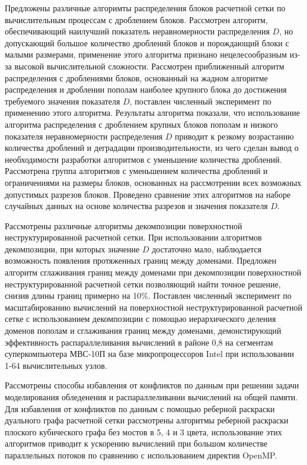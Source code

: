 Предложены различные алгоримты распределения блоков расчетной сетки по вычислительным процессам с дроблением блоков.
Рассмотрен алгоритм, обеспечивающий наилучший показатель неравномерности распределения $D$, но допускающий большое количество дроблений блоков и порождающий блоки с малыми размерами, применение этого алгоритма признано нецелесообразным из-за высокой вычислительной сложности.
Рассмотрен приближенный алгоритм распределения с дроблениями блоков, основанный на жадном алгоритме распределения и дроблении пополам наиболее крупного блока до достижения требуемого значения показателя $D$, поставлен численный эксперимент по применению этого алгоритма.
Результаты алгоритма показали, что использование алгоритма распределения с дроблением крупных блоков пополам и низкого показателя неравномерности распределения $D$ приводит к резкому возрастанию количества дроблений и деградации производительности, из чего сделан вывод о необходимости разработки алгоритмов с уменьшение количества дроблений.
Рассмотрена группа алгоритмов с уменьшением количества дроблений и ограничениями на размеры блоков, основанных на рассмотрении всех возможных допустимых разрезов блоков.
Проведено сравнение этих алгоритмов на наборе случайных данных на основе количества разрезов и значения показателя $D$.

Рассмотрены различные алгоритмы декомпозиции поверхностной неструктурированной расчетной сетки.
При использовании алгоритмов декомпозиции, при которых значение $D$ достаточно мало, наблюдается возможность появления протяженных границ между доменами.
Предложен алгоритм сглаживания границ между доменами при декомпозиции поверхностной неструктурированной расчетной сетки позволяющий найти точное решение, снизив длины границ примерно на 10\%.
Поставлен численный эксперимент по масштабированию вычислений на поверхностной неструктурированной расчетной сетке с использованием декомпозиции с помощью иерархического деления доменов пополам и сглаживания границ между доменами, демонстирующий эффективность распараллеливания вычислений в районе 0,8 на сегментам суперкомпьютера МВС-10П на базе микропроцессоров Intel при использовании 1-64 вычислительных узлов.

Рассмотрены способы избавления от конфликтов по данным при решении задачи моделирования обледенения и распараллеливании вычислений на общей памяти.
Для избавления от конфликтов по данным с помощью реберной раскраски дуального графа расчетной сетки рассмотрены алгоритмы реберной раскраски плоского кубического графа без мостов в 5, 4 и 3 цвета, использование этих алгоритмов приводит к ускорению вычислений при большом количестве параллельных потоков по сравнению с использованием директив OpenMP.

